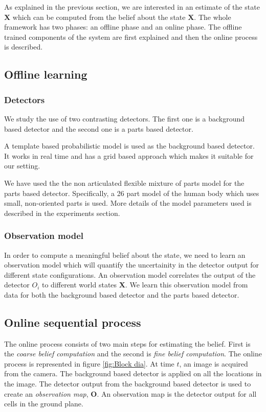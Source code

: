\documentclass[10pt,twocolumn,letterpaper]{article}
\begin{document}
As explained in the previous section, we are interested in an estimate of the state $\textbf{X}$ which can be computed from the belief about the state $\textbf{X}$. The whole framework has two phases: an offline phase and an online phase. The offline trained components of the system are first explained and then the online process is described.

 \subsection{Offline learning}
 
 \subsubsection{Detectors}
We study the use of two contrasting detectors. The first one is a background based detector and the second one is a parts based detector.

A template based probabilistic model is used as the background based detector\cite{englebienneFast}. It works in real time and has a grid based approach which makes it suitable for our setting.

We have used the the non articulated flexible mixture of parts model\cite{partsDeva} for the parts based detector. Specifically, a 26 part model of the human body which uses small, non-oriented parts is used.
More details of the model parameters used is described in the experiments section.

\subsubsection{Observation model}
In order to compute a meaningful belief about the state, we need to learn an observation model which will quantify the uncertainity in the detector output for different state configurations. An observation model correlates the output of the detector $O_{i}$ to different world states $\textbf{X}$.
We learn this observation model from data for both the background based detector and the parts based detector.
\subsection{Online sequential process}
The online process consists of two main steps for estimating the belief. First is the \textit{coarse belief computation} and the second is \textit{fine belief computation}. The online process is represented in figure \ref{fig:Block dia}.
At time $t $, an image is acquired from the camera. The background based detector is applied on all the locations in the image. The detector output from the background based detector is used to create an \textit{observation map}, $\textbf{O}$. An observation map is the detector output for all cells in the ground plane.  
\end{document}
